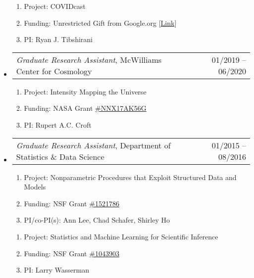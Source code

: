 \documentclass[letterpaper,10pt]{article}
\makeatletter
\newcommand{\subheadingoneline}[2]{
\begin{tabular*}{6.55in}{l@{\cftdotfill{\cftsecdotsep}\extracolsep{\fill}}r}
#1 & #2 \\ 
\end{tabular*}}
\makeatother
\begin{document}
\begin{itemize}[leftmargin=0.4cm, itemsep=0.5cm]
\begin{enumerate}[leftmargin=0.3cm, itemsep=-0.05ex]
	\item[] Project: COVIDcast
	\item[] Funding: Unrestricted Gift from Google.org [\href{https://www.cmu.edu/dietrich/news/news-stories/2020/september/delphi-google.html}{Link}]
	\item[] PI: Ryan J. Tibshirani
\end{enumerate}

\item[] \hspace{-2ex}\subheadingoneline{{\it Graduate Research Assistant}, McWilliams Center for Cosmology}{01/2019 -- 06/2020}
\vspace{-0.5cm}

\begin{enumerate}[leftmargin=0.3cm, itemsep=-0.05ex]
	\item[] Project: Intensity Mapping the Universe
	\item[] Funding: NASA Grant \href{http://adsabs.harvard.edu/abs/2016atp..prop...26C}{\#NNX17AK56G}
	\item[] PI: Rupert A.C. Croft
\end{enumerate}


\item[] \hspace{-2ex}\subheadingoneline{{\it Graduate Research Assistant}, Department of Statistics \& Data Science}{01/2015 -- 08/2016}
\vspace{-0.5cm}

\begin{enumerate}[leftmargin=0.3cm, itemsep=-0.05ex]
	\item[] Project: Nonparametric Procedures that Exploit Structured Data and Models 
	\item[] Funding: NSF Grant \href{https://www.nsf.gov/awardsearch/showAward?AWD_ID=1521786}{\#1521786}
	\item[] PI/co-PI(s): Ann Lee, Chad Schafer, Shirley Ho
\end{enumerate}

\begin{enumerate}[leftmargin=0.3cm, itemsep=-0.05ex]
	\item[] Project: Statistics and Machine Learning for Scientific Inference
	\item[] Funding: NSF Grant \href{https://www.nsf.gov/awardsearch/showAward?AWD_ID=1043903&HistoricalAwards=false}{\#1043903}
	\item[] PI: Larry Wasserman
\end{enumerate}


\end{itemize}
\end{document}
